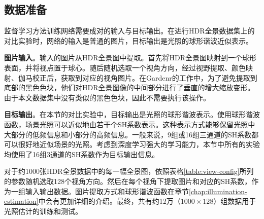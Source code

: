 \subsection{数据准备}
监督学习方法训练网络需要成对的输入与目标输出。在进行HDR全景数据集上的对比实验时，网络的输入是普通的图片，目标输出是光照的球形谐波近似表示。

\textbf{图片输入}。输入的图片从HDR全景图中提取。首先将HDR全景图映射到一个球形表面，并将视点置于球心。随后随机选取一个视角方向，经过视野提取、颜色映射、伽马校正后，获取到对应的视角图片。在Gardenr\cite{gardner2017learning}的工作中，为了避免提取到底部的黑色色块，他们对HDR全景图像的中间部分进行了垂直的增大缩放变形。由于本文数据集中没有类似的黑色色块，因此不需要执行该操作。

\textbf{目标输出}。在本节的对比实验中，目标输出是光照的球形谐波表示。使用球形谐波函数，场景光照可以近似地由若干个SH系数表示。这种表示方式能够保留光照中大部分的低频信息和小部分的高频信息。一般来说，9组或16组三通道的SH系数都可以很好地近似场景的光照。考虑到深度学习强大的学习能力，本节中所有的实验均使用了16组3通道的SH系数作为目标输出信息。


对于约1000张HDR全景数据中的每一幅全景图，依照表格\ref{table:view-config}所列的参数随机选取128个视角方向。然后在每个视角下提取图片和对应的SH系数，作为一组输入输出数据。图片提取方式和球形谐波函数在章节\ref{chap:illumination-estimation}中会有更加详细的介绍。最终，共有约12万（$1000\times128$）组数据用于光照估计的训练和测试。

